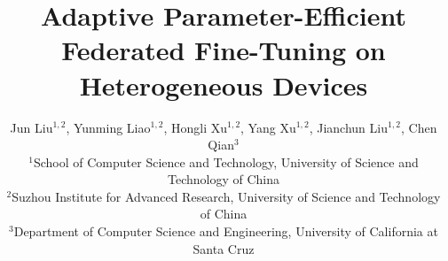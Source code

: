 

\date{}

\title{\Large \bf Adaptive Parameter-Efficient Federated Fine-Tuning on Heterogeneous Devices}
\author{
Jun Liu$^{1,2}$, Yunming Liao$^{1,2}$, Hongli Xu$^{1,2}$, Yang Xu$^{1,2}$,
Jianchun Liu$^{1,2}$, Chen Qian$^{3}$\\
$^{1}$School of Computer Science and Technology, University of Science and Technology of China\\
$^{2}$Suzhou Institute for Advanced Research, University of Science and Technology of China\\
$^{3}$Department of Computer Science and Engineering, University of California at Santa Cruz\\
}
